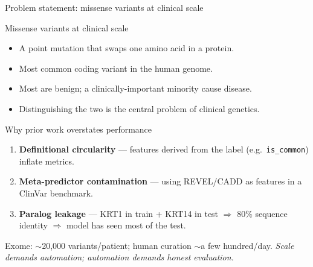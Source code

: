 \documentclass[aspectratio=169,10pt]{beamer}
\begin{document}
\begin{frame}{Problem statement: missense variants at clinical scale}
  \footnotesize
  \begin{block}{Missense variants at clinical scale}
    \begin{itemize}\setlength{\itemsep}{0.05em}
      \item A point mutation that swaps one amino acid in a protein.
      \item Most common coding variant in the human genome.
      \item Most are benign; a clinically-important minority cause disease.
      \item Distinguishing the two is the central problem of clinical
            genetics.
    \end{itemize}
  \end{block}

  \vspace{0.2em}
  \begin{alertblock}{Why prior work overstates performance}
    \begin{enumerate}\setlength{\itemsep}{0.05em}
      \item \textbf{Definitional circularity} --- features derived from
            the label (e.g.\ \texttt{is\_common}) inflate metrics.
      \item \textbf{Meta-predictor contamination} --- using REVEL/CADD
            as features in a ClinVar benchmark.
      \item \textbf{Paralog leakage} --- KRT1 in train + KRT14 in test
            $\Rightarrow$ 80\% sequence identity $\Rightarrow$ model
            has seen most of the test.
    \end{enumerate}
    \vspace{0.2em}
    \scriptsize
    Exome: $\sim$20{,}000 variants/patient; human curation $\sim$a few
    hundred/day. \emph{Scale demands automation; automation demands
    honest evaluation.}
  \end{alertblock}
\end{frame}
\end{document}
